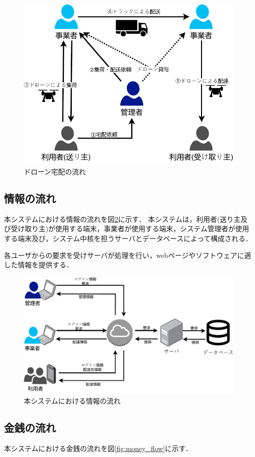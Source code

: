 \documentclass[a4paper, titlepage]{jsarticle}
\begin{document}
\begin{figure}[H]
  \centering
  \includegraphics[width=0.6\linewidth]{./overview_flow.pdf}
  \caption{ドローン宅配の流れ}
  \label{fig:overview_flow}
\end{figure}

\subsection{情報の流れ}
本システムにおける情報の流れを図\ref{fig:info_flow}に示す．
本システムは，利用者(送り主及び受け取り主)が使用する端末，事業者が使用する端末，システム管理者が使用する端末及び，システム中核を担うサーバとデータベースによって構成される．

各ユーザからの要求を受けサーバが処理を行い，webページやソフトウェアに適した情報を提供する．

\begin{figure}[H]
  \centering
  \includegraphics[width=0.8\linewidth]{./info_flow.pdf}
  \caption{本システムにおける情報の流れ}
  \label{fig:info_flow}
\end{figure}

\subsection{金銭の流れ}
本システムにおける金銭の流れを図\ref{fig:money_flow}に示す．
\end{document}
